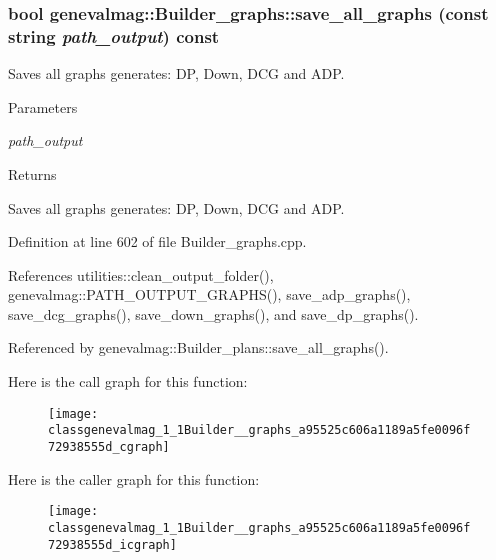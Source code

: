 \hypertarget{classgenevalmag_1_1Builder__graphs_a95525c606a1189a5fe0096f72938555d}{
\subsubsection[{save\_\-all\_\-graphs}]{\setlength{\rightskip}{0pt plus 5cm}bool genevalmag::Builder\_\-graphs::save\_\-all\_\-graphs (const string {\em path\_\-output}) const}}
\label{classgenevalmag_1_1Builder__graphs_a95525c606a1189a5fe0096f72938555d}
Saves all graphs generates: DP, Down, DCG and ADP. 
\begin{DoxyParams}{Parameters}
\item[{\em path\_\-output}]\end{DoxyParams}
\begin{DoxyReturn}{Returns}

\end{DoxyReturn}
Saves all graphs generates: DP, Down, DCG and ADP. 

Definition at line 602 of file Builder\_\-graphs.cpp.



References utilities::clean\_\-output\_\-folder(), genevalmag::PATH\_\-OUTPUT\_\-GRAPHS(), save\_\-adp\_\-graphs(), save\_\-dcg\_\-graphs(), save\_\-down\_\-graphs(), and save\_\-dp\_\-graphs().



Referenced by genevalmag::Builder\_\-plans::save\_\-all\_\-graphs().



Here is the call graph for this function:\nopagebreak
\begin{figure}[H]
\begin{center}
\leavevmode
\texttt{[image: classgenevalmag\_1\_1Builder\_\_graphs\_a95525c606a1189a5fe0096f72938555d\_cgraph]}
\end{center}
\end{figure}




Here is the caller graph for this function:\nopagebreak
\begin{figure}[H]
\begin{center}
\leavevmode
\texttt{[image: classgenevalmag\_1\_1Builder\_\_graphs\_a95525c606a1189a5fe0096f72938555d\_icgraph]}
\end{center}
\end{figure}



